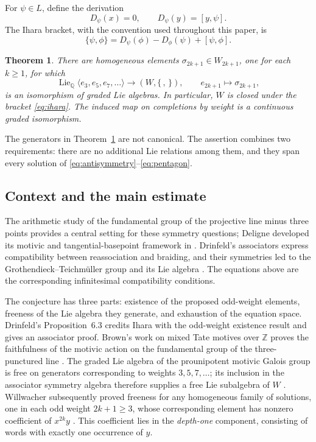 \documentclass[11pt]{article}
\newcommand{\Q}{\mathbb Q}
\newcommand{\Lie}{\operatorname{Lie}}
\newtheorem{theorem}{Theorem}[section]
\theoremstyle{definition}
\theoremstyle{remark}
\numberwithin{equation}{section}
\begin{document}
For \(\psi\in L\), define the derivation
\begin{equation}\label{eq:ihara-derivation}
 D_\psi(x)=0,\qquad D_\psi(y)=[y,\psi].
\end{equation}
The Ihara bracket, with the convention used throughout this paper, is
\begin{equation}\label{eq:ihara}
 \{\psi,\phi\}=D_\psi(\phi)-D_\phi(\psi)+[\psi,\phi].
\end{equation}

\begin{theorem}\label{thm:main}
There are homogeneous elements
\(\sigma_{2k+1}\in W_{2k+1}\), one for each \(k\ge1\), for which
\[
 \Lie_{\Q}\langle e_3,e_5,e_7,\ldots\rangle
 \longrightarrow (W,\{\, ,\,\}),\qquad
 e_{2k+1}\longmapsto\sigma_{2k+1},
\]
is an isomorphism of graded Lie algebras.
In particular, \(W\) is closed under the bracket
\eqref{eq:ihara}.  The induced map on completions by weight is a
continuous graded isomorphism.
\end{theorem}

The generators in Theorem~\ref{thm:main} are not canonical.
The assertion combines two requirements: there are no additional Lie
relations among them, and they span every solution of
\eqref{eq:antisymmetry}--\eqref{eq:pentagon}.

\subsection{Context and the main estimate}
The arithmetic study of the fundamental group of the projective line
minus three points provides a central setting for these symmetry
questions; Deligne developed its motivic and tangential-basepoint
framework in \cite[Introduction and Section~15]{Deligne}.
Drinfeld's associators express compatibility between reassociation and
braiding, and their symmetries led to the
Grothendieck--Teichm\"uller group and its Lie algebra
\cite{Drinfeld}.  The equations above are the corresponding
infinitesimal compatibility conditions.

The conjecture has three parts: existence of the proposed odd-weight
elements, freeness of the Lie algebra they generate, and exhaustion of
the equation space.  Drinfeld's Proposition~6.3 credits Ihara with the
odd-weight existence result and gives an associator proof.
Brown's work on mixed Tate motives over \(\mathbb Z\) proves the
faithfulness of the motivic action on the fundamental group of the
three-punctured line \cite{Brown}.  The graded Lie algebra of the
prounipotent motivic Galois group is free on generators corresponding to weights
\(3,5,7,\ldots\); its inclusion in the associator symmetry algebra
therefore supplies a free Lie subalgebra of \(W\)
\cite[Section~1.4.2]{BrownDepth}.
Willwacher subsequently proved freeness for any homogeneous family of
solutions, one in each odd weight \(2k+1\ge3\), whose corresponding
element has nonzero coefficient of
\(x^{2k}y\) \cite[Theorem~1.2]{WillwacherFree}.
This coefficient lies in the \emph{depth-one} component, consisting of
words with exactly one occurrence of \(y\).
\end{document}
